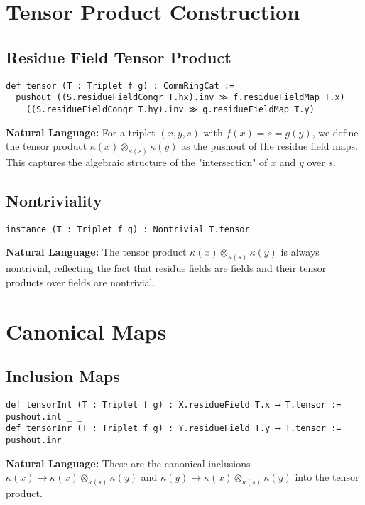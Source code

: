 \documentclass{article}
\theoremstyle{definition}
\begin{document}
\section{Tensor Product Construction}

\subsection{Residue Field Tensor Product}

\begin{lstlisting}
def tensor (T : Triplet f g) : CommRingCat :=
  pushout ((S.residueFieldCongr T.hx).inv ≫ f.residueFieldMap T.x)
    ((S.residueFieldCongr T.hy).inv ≫ g.residueFieldMap T.y)
\end{lstlisting}

\textbf{Natural Language:} For a triplet $(x, y, s)$ with $f(x) = s = g(y)$, we define the tensor product $\kappa(x) \otimes_{\kappa(s)} \kappa(y)$ as the pushout of the residue field maps. This captures the algebraic structure of the "intersection" of $x$ and $y$ over $s$.

\subsection{Nontriviality}

\begin{lstlisting}
instance (T : Triplet f g) : Nontrivial T.tensor
\end{lstlisting}

\textbf{Natural Language:} The tensor product $\kappa(x) \otimes_{\kappa(s)} \kappa(y)$ is always nontrivial, reflecting the fact that residue fields are fields and their tensor products over fields are nontrivial.

\section{Canonical Maps}

\subsection{Inclusion Maps}

\begin{lstlisting}
def tensorInl (T : Triplet f g) : X.residueField T.x ⟶ T.tensor := pushout.inl _ _
def tensorInr (T : Triplet f g) : Y.residueField T.y ⟶ T.tensor := pushout.inr _ _
\end{lstlisting}

\textbf{Natural Language:} These are the canonical inclusions $\kappa(x) \to \kappa(x) \otimes_{\kappa(s)} \kappa(y)$ and $\kappa(y) \to \kappa(x) \otimes_{\kappa(s)} \kappa(y)$ into the tensor product.
\end{document}
